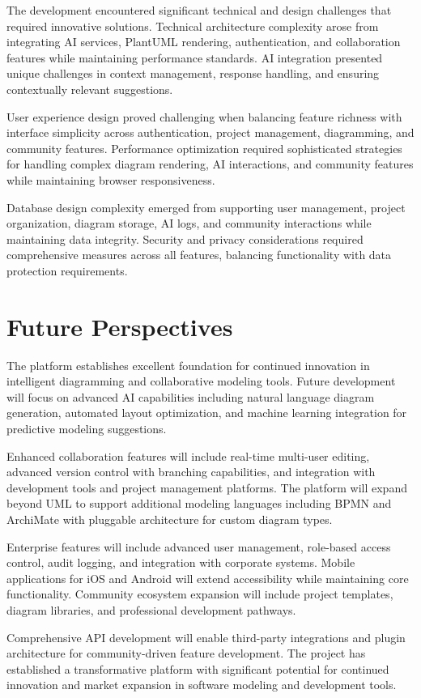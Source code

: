 The development encountered significant technical and design challenges that required innovative solutions. Technical architecture complexity arose from integrating AI services, PlantUML rendering, authentication, and collaboration features while maintaining performance standards. AI integration presented unique challenges in context management, response handling, and ensuring contextually relevant suggestions.

User experience design proved challenging when balancing feature richness with interface simplicity across authentication, project management, diagramming, and community features. Performance optimization required sophisticated strategies for handling complex diagram rendering, AI interactions, and community features while maintaining browser responsiveness.

Database design complexity emerged from supporting user management, project organization, diagram storage, AI logs, and community interactions while maintaining data integrity. Security and privacy considerations required comprehensive measures across all features, balancing functionality with data protection requirements.

\section{Future Perspectives}

The platform establishes excellent foundation for continued innovation in intelligent diagramming and collaborative modeling tools. Future development will focus on advanced AI capabilities including natural language diagram generation, automated layout optimization, and machine learning integration for predictive modeling suggestions.

Enhanced collaboration features will include real-time multi-user editing, advanced version control with branching capabilities, and integration with development tools and project management platforms. The platform will expand beyond UML to support additional modeling languages including BPMN and ArchiMate with pluggable architecture for custom diagram types.

Enterprise features will include advanced user management, role-based access control, audit logging, and integration with corporate systems. Mobile applications for iOS and Android will extend accessibility while maintaining core functionality. Community ecosystem expansion will include project templates, diagram libraries, and professional development pathways.

Comprehensive API development will enable third-party integrations and plugin architecture for community-driven feature development. The project has established a transformative platform with significant potential for continued innovation and market expansion in software modeling and development tools.